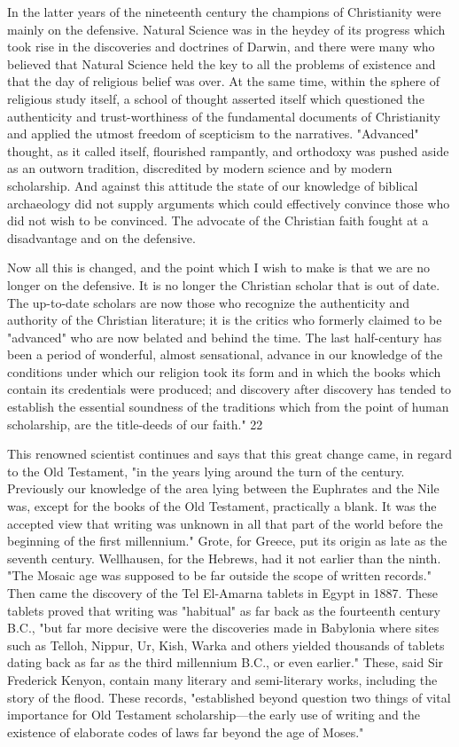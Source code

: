 In the latter years of the nineteenth century the champions of Christianity were mainly on the
defensive. Natural Science was in the heydey of its progress which took rise in the
discoveries and doctrines of Darwin, and there were many who believed that Natural Science
held the key to all the problems of existence and that the day of religious belief was over. At
the same time, within the sphere of religious study itself, a school of thought asserted itself
which questioned the authenticity and trust-worthiness of the fundamental documents of
Christianity and applied the utmost freedom of scepticism to the narratives. "Advanced"
thought, as it called itself, flourished rampantly, and orthodoxy was pushed aside as an
outworn tradition, discredited by modern science and by modern scholarship. And against
this attitude the state of our knowledge of biblical archaeology did not supply arguments
which could effectively convince those who did not wish to be convinced. The advocate of
the Christian faith fought at a disadvantage and on the defensive.

Now all this is changed, and the point which I wish to make is that we are no longer on the
defensive. It is no longer the Christian scholar that is out of date. The up-to-date scholars are
now those who recognize the authenticity and authority of the Christian literature; it is the
critics who formerly claimed to be "advanced" who are now belated and behind the time. The
last half-century has been a period of wonderful, almost sensational, advance in our
knowledge of the conditions under which our religion took its form and in which the books
which contain its credentials were produced; and discovery after discovery has tended to
establish the essential soundness of the traditions which from the point of human scholarship,
are the title-deeds of our faith." 22

This renowned scientist continues and says that this great change came, in regard to the Old
Testament, "in the years lying around the turn of the century. Previously our knowledge of
the area lying between the Euphrates and the Nile was, except for the books of the Old
Testament, practically a blank. It was the accepted view that writing was unknown in all that
part of the world before the beginning of the first millennium." Grote, for Greece, put its
origin as late as the seventh century. Wellhausen, for the Hebrews, had it not earlier than the
ninth. "The Mosaic age was supposed to be far outside the scope of written records." Then
came the discovery of the Tel El-Amarna tablets in Egypt in 1887. These tablets proved that
writing was "habitual" as far back as the fourteenth century B.C., "but far more decisive were
the discoveries made in Babylonia where sites such as Telloh, Nippur, Ur, Kish, Warka and
others yielded thousands of tablets dating back as far as the third millennium B.C., or even
earlier." These, said Sir Frederick Kenyon, contain many literary and semi-literary works,
including the story of the flood. These records, "established beyond question two things of
vital importance for Old Testament scholarship—the early use of writing and the existence of
elaborate codes of laws far beyond the age of Moses."

